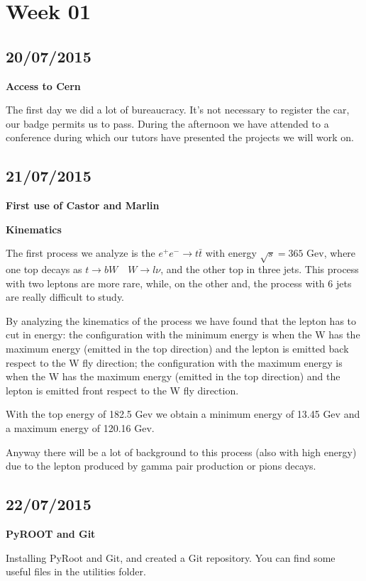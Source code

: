 \section{Week 01}
\subsection{20/07/2015}

\textbf{Access to Cern}

The first day we did a lot of bureaucracy. It's not necessary to register the car, our badge permits us to pass.
During the afternoon we have attended to a conference during which our tutors have presented the projects we will work on.


\subsection{21/07/2015}

\textbf{First use of Castor and Marlin}

\textbf{Kinematics}

The first process we analyze is the $e^+ e^- \to t \bar{t} $ with energy $\sqrt{s}=365$ Gev, where one top decays as $t \to bW \quad W \to l\nu$, and the other top in three jets. This process with two leptons are more rare, while, on the other and, the process with 6 jets are really difficult to study.

By analyzing the kinematics of the process we have found that the lepton has to cut in energy:
the configuration with the minimum energy is when the W has the maximum energy (emitted in the top direction) and the lepton is emitted back respect to the W fly direction;
the configuration with the maximum energy is when the W has the maximum energy (emitted in the top direction) and the lepton is emitted front respect to the W fly direction.

With the top energy of 182.5 Gev we obtain a minimum energy of 13.45 Gev and a maximum energy of 120.16 Gev. 

Anyway there will be a lot of background to this process (also with high energy) due to the lepton produced by gamma pair production or pions decays.

\subsection{22/07/2015}

\textbf{PyROOT and Git}

Installing PyRoot and Git, and created a Git repository. You can find some useful files in the utilities folder.

